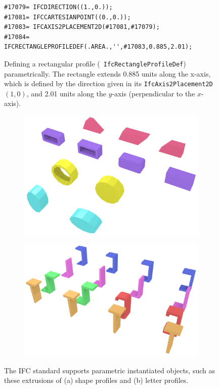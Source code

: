 \begin{figure}
\begin{lstlisting}[frame=single]
#17079= IFCDIRECTION((1.,0.));
#17081= IFCCARTESIANPOINT((0.,0.));
#17083= IFCAXIS2PLACEMENT2D(#17081,#17079);
#17084= IFCRECTANGLEPROFILEDEF(.AREA.,'',#17083,0.885,2.01);
\end{lstlisting}
\caption{Defining a rectangular profile (\ie\ \texttt{IfcRectangleProfileDef}) parametrically.
The rectangle extends 0.885 units along the x-axis, which is defined by the direction given in its \texttt{IfcAxis2Placement2D} \((1,0)\), and 2.01 units along the \(y\)-axis (perpendicular to the \(x\)-axis).}%
\label{fig:parametric}
\end{figure}

\begin{figure}
\centering
\begin{subfigure}[b]{0.45\linewidth}
	\includegraphics[width=\linewidth]{figs/profiles}%
	\label{subfig:profiles}
\end{subfigure}
\quad
\begin{subfigure}[b]{0.45\linewidth}
	\includegraphics[width=\linewidth]{figs/letter_profiles}%
	\label{subfig:letter-profiles}
\end{subfigure}
\caption{The IFC standard supports parametric instantiated objects, such as these extrusions of (a) shape profiles and (b) letter profiles.}%
\label{fig:profiles}
\end{figure}

